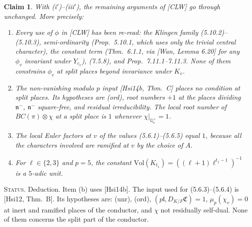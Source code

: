 \documentclass[11pt]{amsart}
\newtheorem{claim}[theorem]{Claim}
\theoremstyle{definition}
\theoremstyle{remark}
\newcommand{\Q}{\mathbb{Q}}
\newcommand{\Vol}{\mathrm{Vol}}
\newcommand{\status}[1]{\par\smallskip\noindent\textsc{Status.} #1\par\smallskip}
\begin{document}
\begin{claim}\label{claim:insert}
With (i$'$)--(iii$'$), the remaining arguments of [CLW] go through unchanged. More precisely:
\begin{enumerate}[label=(\alph*)]
\item Every use of $\phi$ in [CLW] has been re-read: the Klingen family (5.10.2)--(5.10.3), semi-ordinarity (Prop.~5.10.1, which uses only the trivial central character), the constant term (Thm.~6.1.1, via [Wan, Lemma 6.20] for any $\phi_v$ invariant under $Y_{c_v}$), (7.5.8), and Prop.~7.11.1--7.11.3. None of them constrains $\phi_v$ at split places beyond invariance under $K_v$.
\item The non-vanishing modulo $p$ input [Hsi14b, Thm.~C] places no condition at split places. Its hypotheses are (ord), root numbers $+1$ at the places dividing $\mathfrak n^-$, $\mathfrak n^-$ square-free, and residual irreducibility. The local root number of $BC(\pi)\otimes\chi$ at a split place is $1$ whenever $\chi|_{\Q_v^\times}=1$.
\item The local Euler factors at $v$ of the values (5.6.1)--(5.6.5) equal $1$, because all the characters involved are ramified at $v$ by the choice of $A$.
\item For $\ell\in\{2,3\}$ and $p=5$, the constant $\Vol(K_{t_1})=((\ell+1)\ell^{t_1-1})^{-1}$ is a $5$-adic unit.
\end{enumerate}
\end{claim}
\status{Deduction. Item (b) uses [Hsi14b]. The input used for (5.6.3)--(5.6.4) is [Hsi12, Thm.~B]. Its hypotheses are: (unr), (ord), $(p\mathfrak l,D_{K/F}\mathfrak C)=1$, $\mu_p(\chi_v)=0$ at inert and ramified places of the conductor, and $\chi$ not residually self-dual. None of them concerns the split part of the conductor.}
\end{document}
